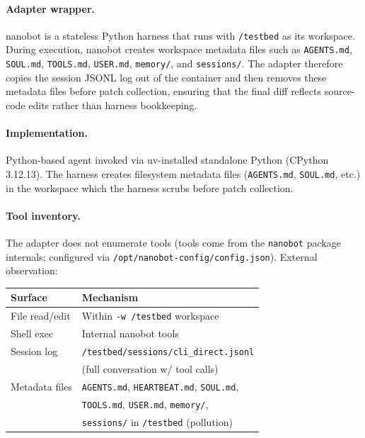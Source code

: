 \paragraph{Adapter wrapper.}
nanobot is a stateless Python harness that runs with \texttt{/testbed} as its workspace. During execution, nanobot creates workspace metadata files such as \texttt{AGENTS.md}, \texttt{SOUL.md}, \texttt{TOOLS.md}, \texttt{USER.md}, \texttt{memory/}, and \texttt{sessions/}. The adapter therefore copies the session JSONL log out of the container and then removes these metadata files before patch collection, ensuring that the final diff reflects source-code edits rather than harness bookkeeping.


\paragraph{Implementation.}
Python-based agent invoked via uv-installed standalone Python (CPython 3.12.13). The harness creates filesystem metadata files (\texttt{AGENTS.md}, \texttt{SOUL.md}, etc.) in the workspace which the harness scrubs before patch collection.

\paragraph{Tool inventory.}
The adapter does not enumerate tools (tools come from the \texttt{nanobot} package internals; configured via \texttt{/opt/nanobot-config/config.json}). External observation:

\begin{center}
\begin{tabular}{ll}
\toprule
\textbf{Surface} & \textbf{Mechanism} \\
\midrule
File read/edit  & Within \texttt{-w /testbed} workspace \\
Shell exec      & Internal nanobot tools \\
Session log     & \texttt{/testbed/sessions/cli\_direct.jsonl} \\
                & (full conversation w/ tool calls) \\
Metadata files  & \texttt{AGENTS.md}, \texttt{HEARTBEAT.md}, \texttt{SOUL.md}, \\
                & \texttt{TOOLS.md}, \texttt{USER.md}, \texttt{memory/}, \\
                & \texttt{sessions/} in \texttt{/testbed} (pollution) \\
\bottomrule
\end{tabular}
\end{center}

